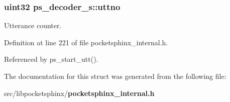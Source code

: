 \subsubsection[{uttno}]{\setlength{\rightskip}{0pt plus 5cm}uint32 ps\-\_\-decoder\-\_\-s\-::uttno}\label{structps__decoder__s_a0f597370dd162c2799efe216c9b991fc}


Utterance counter. 



Definition at line 221 of file pocketsphinx\-\_\-internal.\-h.



Referenced by ps\-\_\-start\-\_\-utt().



The documentation for this struct was generated from the following file\-:\begin{DoxyCompactItemize}
\item 
src/libpocketsphinx/{\bf pocketsphinx\-\_\-internal.\-h}\end{DoxyCompactItemize}
